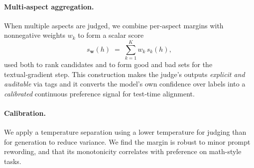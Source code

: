 \documentclass{article}
\theoremstyle{plain}
\theoremstyle{definition}
\theoremstyle{remark}
\begin{document}
\paragraph{Multi‑aspect aggregation.} When multiple aspects are judged, we combine per‑aspect margins with nonnegative weights \(w_k\) to form a scalar score
\[
  s_{\mathbf{w}}(h)\;=\;\sum_{k=1}^{K} w_k\, s_k(h),
\]
used both to rank candidates and to form good and bad sets for the textual‑gradient step. This construction makes the judge’s outputs \emph{explicit and auditable} via tags and it converts the model’s own confidence over labels into a \emph{calibrated} continuous preference signal for test‑time alignment.

\paragraph{Calibration.} We apply a temperature separation using a lower temperature for judging than for generation to reduce variance. We find the margin is robust to minor prompt rewording, and that its monotonicity correlates with preference on math-style tasks.

\end{document}
